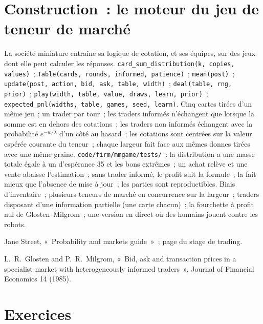 \section{Construction~: le moteur du jeu de teneur de marché}\label{bld:m2:market-making-games:mmgame}

\begin{build}
 La société miniature entraîne sa logique de cotation, et ses équipes, sur des jeux
dont elle peut calculer les réponses.
 \texttt{card\_sum\_distribution(k, copies, values)}~;
\texttt{Table(cards, rounds, informed, patience)}~; \texttt{mean(post)}~;
\texttt{update(post, action, bid, ask, table, width)}~; \texttt{deal(table, rng, prior)}~;
\texttt{play(width, table, value, draws, learn, prior)}~; \texttt{expected\_pnl(widths,
table, games, seed, learn)}.  Cinq cartes tirées d'un même jeu~; un trader par tour~; les traders informés n'échangent
que lorsque la somme est en dehors des cotations~; les traders non informés échangent avec la probabilité
$e^{-w/\lambda}$ d'un côté au hasard~; les cotations sont centrées sur la valeur espérée courante du teneur~;
chaque largeur fait face aux mêmes donnes tirées avec une même graine.
 \texttt{code/firm/mmgame/tests/}~: la distribution a une masse totale égale à un
d'espérance 35 et les bons extrêmes~; un achat relève et une vente abaisse l'estimation~; sans
trader informé, le profit suit la formule~; la  fait mieux que l'absence de mise à jour~; les parties
sont reproductibles.
 Biais d'inventaire~; plusieurs teneurs de marché en concurrence sur la largeur~; traders disposant d'une information partielle (une carte chacun)~;
la fourchette à profit nul de Glosten--Milgrom~; une version en direct où des humains jouent
contre les robots.
\end{build}

\begin{omsources}
\item Jane Street, «~Probability and markets guide~»~; page du stage de trading.
\item L.~R.~Glosten and P.~R.~Milgrom, «~Bid, ask and transaction prices in a specialist
market with heterogeneously informed traders~», Journal of Financial Economics 14 (1985).
\end{omsources}

\section{Exercices}

